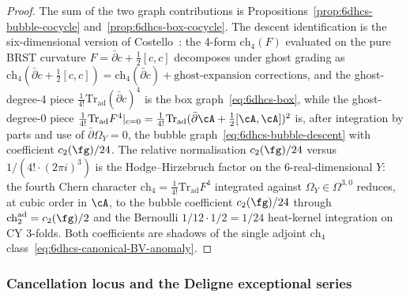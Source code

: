 \begin{proof}
The sum of the two graph contributions is
Propositions~\ref{prop:6dhcs-bubble-cocycle}
and~\ref{prop:6dhcs-box-cocycle}. The descent identification is
the six-dimensional version of
Costello~\cite[Prop.\,3.4]{Costello2017M5}: the 4-form
$\mathrm{ch}_4(F)$ evaluated on the pure BRST curvature
$F=\bar\partial c+\tfrac12[c,c]$ decomposes under ghost grading as
$\mathrm{ch}_4(\bar\partial c+\tfrac12[c,c])
=\mathrm{ch}_4(\bar\partial c)+\text{ghost-expansion corrections}$,
and the ghost-degree-4 piece $\tfrac{1}{4!}\mathrm{Tr}_{\mathrm{ad}}
(\bar\partial c)^4$ is the box graph~\eqref{eq:6dhcs-box}, while
the ghost-degree-0 piece
$\tfrac{1}{4!}\mathrm{Tr}_{\mathrm{ad}}F^4|_{c=0}
=\tfrac{1}{4!}\mathrm{Tr}_{\mathrm{ad}}(\bar\partial\cA
+\tfrac12[\cA,\cA])^2$ is, after integration by parts and use of
$\bar\partial\Omega_Y=0$, the bubble
graph~\eqref{eq:6dhcs-bubble-descent} with coefficient
$c_2(\fg)/24$. The relative normalisation $c_2(\fg)/24$ versus
$1/(4!\cdot(2\pi i)^3)$ is the Hodge--Hirzebruch factor on the
6-real-dimensional $Y$: the fourth Chern character
$\mathrm{ch}_4=\tfrac{1}{4!}\mathrm{Tr}_{\mathrm{ad}}F^4$ integrated
against $\Omega_Y\in\Omega^{3,0}$ reduces, at cubic order in $\cA$,
to the bubble coefficient $c_2(\fg)/24$ through
$\mathrm{ch}_2^{\mathrm{ad}}=c_2(\fg)/2$ and the Bernoulli
$1/12\cdot 1/2=1/24$ heat-kernel integration on CY 3-folds. Both
coefficients are shadows of the single adjoint $\mathrm{ch}_4$
class~\eqref{eq:6dhcs-canonical-BV-anomaly}.
\end{proof}

\subsubsection{Cancellation locus and the Deligne exceptional series}
\label{subsubsec:6dhcs-cancellation-locus}

